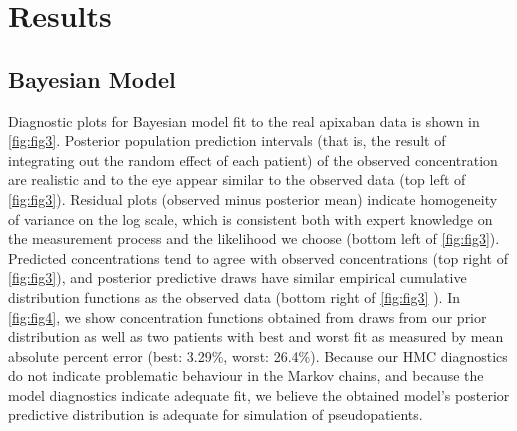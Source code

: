 \section{Results}
\subsection*{Bayesian Model}

Diagnostic plots for Bayesian model fit to the real apixaban data is shown in \cref{fig:fig3}.  Posterior population prediction intervals (that is, the result of integrating out the random effect of each patient) of the observed concentration are realistic and to the eye appear similar to the observed data (top left of \cref{fig:fig3}).  Residual plots (observed minus posterior mean) indicate homogeneity of variance on the log scale, which is consistent both with expert knowledge on the measurement process and the likelihood we choose (bottom left of \cref{fig:fig3}). Predicted concentrations tend to agree with observed concentrations (top right of \cref{fig:fig3}), and posterior predictive draws have similar empirical cumulative distribution functions as the observed data (bottom right of \cref{fig:fig3} ). In \cref{fig:fig4}, we show concentration functions obtained from draws from our prior distribution as well as two patients with best and worst fit as measured by mean absolute percent error (best: 3.29\%, worst: 26.4\%). Because our HMC diagnostics do not indicate problematic behaviour in the Markov chains, and because the model diagnostics indicate adequate fit, we believe the obtained model’s posterior predictive distribution is adequate for simulation of pseudopatients.


